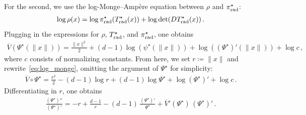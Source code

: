 \documentclass[twoside]{article}
\newcommand{\1}{\mathds{1}}
\newcommand*{\defeq}{\coloneqq}
\newcommand{\pirad}{\pi_{\rm rad}}
\theoremstyle{plain}
\theoremstyle{definition}
\theoremstyle{remark}
\begin{document}
For the second, we use the log-Monge--Amp\`ere equation between $\rho$ and $\pirad^\star$:
\begin{align*}
    \log\rho(x) = \log \pirad^\star(T_{\rm rad}^\star(x)) + \log\det(DT_{\rm rad}^\star(x))\,.
\end{align*}
Plugging in the expressions for $\rho$, $T_{\rm rad}^\star$, and $\pirad^\star$, one obtains
\begin{align}\label{eq:log_monge}
    \overline V(\Psi^\star(\|x\|)) = \frac{\|x\|^2}{2} + (d-1)\log(\psi^\star(\|x\|)) + \log((\Psi^\star)'(\|x\|)) + \log c\,,
\end{align}
where $c$ consists of normalizing constants. From here, we set $r \defeq \|x\|$ and rewrite~\eqref{eq:log_monge}, omitting the argument of $\Psi^\star$ for simplicity:
\begin{align}\label{eq:log_monge_r}
    \overline V\circ \Psi^\star = \frac{r^2}{2} - (d-1)\log r + (d-1)\log \Psi^\star + \log {(\Psi^\star)'} + \log c\,.
\end{align}
Differentiating in $r$, one obtains
\begin{align*}
    \frac{(\Psi^\star)''}{(\Psi^\star)'} = -r + \frac{d-1}{r} - (d-1)\,\frac{(\Psi^\star)'}{\Psi^\star} + \overline{V}'(\Psi^\star)\,(\Psi^\star)'\,. 
\end{align*}
\end{document}
